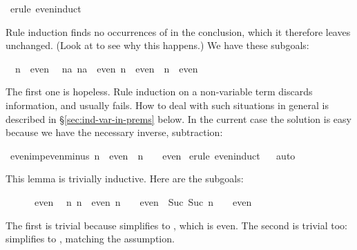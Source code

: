 \begin{isabellebody}
%
\isadelimproof
%
\endisadelimproof
%
\isatagproof
{}\isamarkupfalse%
\ {\isacharparenleft}erule\ even{\isachardot}induct{\isacharparenright}\isanewline
{}\isamarkupfalse%
%
\endisatagproof
{\isafoldproof}%
%
\isadelimproof
%
\endisadelimproof
%
\isadelimproof
%
\endisadelimproof
%
\isatagproof
%
\begin{isamarkuptxt}%
Rule induction finds no occurrences of  in the
conclusion, which it therefore leaves unchanged.  (Look at
 to see why this happens.)  We have these subgoals:
\begin{isabelle}%
\ {}{\isachardot}\ n\ {\isasymin}\ even\isanewline
\ {}{\isachardot}\ {\isasymAnd}na{\isachardot}\ {\isasymlbrakk}na\ {\isasymin}\ even{\isacharsemicolon}\ n\ {\isasymin}\ even{\isasymrbrakk}\ {\isasymLongrightarrow}\ n\ {\isasymin}\ even%
\end{isabelle}
The first one is hopeless.  Rule induction on
a non-variable term discards information, and usually fails.
How to deal with such situations
in general is described in {\S}\ref{sec:ind-var-in-prems} below.
In the current case the solution is easy because
we have the necessary inverse, subtraction:%
\end{isamarkuptxt}%
\isamarkuptrue%
%
\endisatagproof
{\isafoldproof}%
%
\isadelimproof
%
\endisadelimproof
{}\isamarkupfalse%
\ even{\isacharunderscore}imp{\isacharunderscore}even{\isacharunderscore}minus{\isacharunderscore}{}{\isacharcolon}\ {\isachardoublequoteopen}n\ {\isasymin}\ even\ {\isasymLongrightarrow}\ n\ {\isacharminus}\ {}\ {\isasymin}\ even{\isachardoublequoteclose}\isanewline
%
\isadelimproof
%
\endisadelimproof
%
\isatagproof
{}\isamarkupfalse%
\ {\isacharparenleft}erule\ even{\isachardot}induct{\isacharparenright}\isanewline
\ \isamarkupfalse%
\ auto\isanewline
{}\isamarkupfalse%
%
\endisatagproof
{\isafoldproof}%
%
\isadelimproof
%
\endisadelimproof
%
\isadelimproof
%
\endisadelimproof
%
\isatagproof
%
\begin{isamarkuptxt}%
This lemma is trivially inductive.  Here are the subgoals:
\begin{isabelle}%
\ {}{\isachardot}\ {}\ {\isacharminus}\ {}\ {\isasymin}\ even\isanewline
\ {}{\isachardot}\ {\isasymAnd}n{\isachardot}\ {\isasymlbrakk}n\ {\isasymin}\ even{\isacharsemicolon}\ n\ {\isacharminus}\ {}\ {\isasymin}\ even{\isasymrbrakk}\ {\isasymLongrightarrow}\ Suc\ {\isacharparenleft}Suc\ n{\isacharparenright}\ {\isacharminus}\ {}\ {\isasymin}\ even%
\end{isabelle}
The first is trivial because  simplifies to , which is
even.  The second is trivial too:  simplifies to
, matching the assumption.%


\end{isamarkuptxt}
\end{isabellebody}
